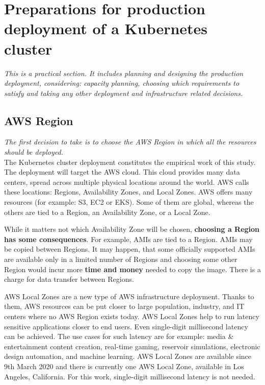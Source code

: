\section{Preparations for production deployment of a Kubernetes cluster}
\textit{This is a practical section. It includes planning and designing the production deployment, considering: capacity planning, choosing which requirements to satisfy and taking any other deployment and infrastructure related decisions.}
~\\

\subsection{AWS Region}
\textit{The first decision to take is to choose the AWS Region in which all the resources should be deployed.}
\\

The Kubernetes cluster deployment constitutes the empirical work of this study. The deployment will target the AWS cloud. This cloud provides many data centers, spread across multiple physical locations around the world. AWS calls these locations: Regions, Availability Zones, and Local Zones. AWS offers many resources (for example: S3, EC2 or EKS). Some of them are global, whereas the others are tied to a Region, an Availability Zone, or a Local Zone\cite{az}.

While it matters not which Availability Zone will be chosen, \textbf{choosing a Region has some consequences}. For example, AMIs are tied to a Region. AMIs may be copied between Regions. It may happen, that some officially supported AMIs are available only in a limited number of Regions and choosing some other Region would incur more \textbf{time and money} needed to copy the image. There is a charge for data transfer between Regions\cite{az}.

AWS Local Zones are a new type of AWS infrastructure deployment. Thanks to them, AWS resources can be put closer to large population, industry, and IT centers where no AWS Region exists today. AWS Local Zones help to run latency sensitive applications closer to end users. Even single-digit millisecond latency can be achieved. The use cases for such latency are for example: media & entertainment content creation, real-time gaming, reservoir simulations, electronic design automation, and machine learning\cite{lz}. AWS Local Zones are available since 9th March 2020 and there is currently one AWS Local Zone, available in Los Angeles, California\cite{lz-blog}. For this work, single-digit millisecond latency is not needed.

